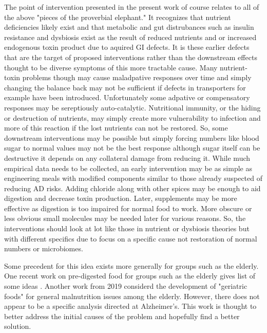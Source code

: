 The point of intervention presented in the present work
of course relates to all of the above "pieces of the proverbial
elephant." It recognizes that nutrient deficiencies likely
exist and that metabolic and gut distrubances such as
insulin resistance and dysbiosis exist as the result of
reduced nutrients and or increased endogenous toxin product
due to aquired GI defects. It is these earlier defects
that are the target of proposed interventions rather than
the downstream effects thought to be diverse symptoms
of this more tractable cause. Many nutrient-toxin problems
though may cause maladpative responses over time and simply
changing the balance back may not be sufficient if 
defects in transporters for example have been introduced.
Unfortunately some adpative or compensatory responses
may be sereptiously auto-catalytic. Nutritional immunity,
or the hiding or destruction of nutrients, may simply
create more vulnerability to infection and more of this
reaction if the lost nutrients can not be restored.
So, some downstream interventions may be possible but
simply forcing numbers like blood sugar to normal
values may not be the best response although sugar itself
can be destructive it depends on any collateral damage from
reducing it. 
While much empirical data needs to be collected,
an early intervention may be as simple as engineering meals
with modified components similar to those already suspected
of reducing AD risks.
Adding chloride along with other spices may be enough to
aid digestion and decrease toxin production. 
  Later, supplements may be more
effective as digestion is too impaired for normal food to
work. More obscure or less obvious small molecules may be needed
later for various reasons. So, the interventions should look
at lot like those in nutrient or  dysbiosis theories
but with different specifics due to focus on a specific
cause not restoration of normal numbers or microbiomes.  


Some precedent for this idea exists more generally
for groups such as the elderly.
One recent work on pre-digested food for groups such
as the elderly gives list of some ideas
\cite{Wu_Pu_Jiang_Enhancing_food_digestion_2025}.
Another work from 2019 considerd the development of
"geriatric foods" 
\cite{Kaur_Rasane_Singh_Nutritional_Interventions_Elderly_2019}
for general malnutrition issues among the elderly.
However, there does not appear to be a specific analysis
directed at Alzheimer's. This work is thought to better
address the initial causes of the problem and hopefully
find a better solution.  


